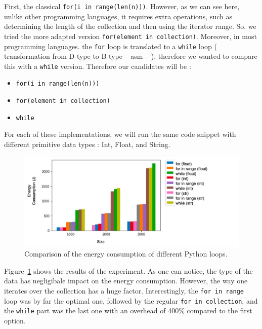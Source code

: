 First, the classical \texttt{for(i in range(len(n)))}.
However, as we can see here, unlike other programming languages, it requires extra operations, such as determining the length of the collection and then using the iterator range.
So, we tried the more adapted version \texttt{for(element in collection)}.
Moreover, in most programming languages. the \texttt{for} loop is translated to a \texttt{while} loop ( transformation from D type to B type -- asm -- ), therefore we wanted to compare this with a \texttt{while} version.
Therefore our candidates will be :

\begin{itemize}[]
    \item \texttt{for(i in range(len(n)))}
    \item \texttt{for(element in collection)}
    \item \texttt{while}
\end{itemize}

For each of these implementations, we will run the same code snippet with different primitive data types : Int, Float, and String.
\begin{figure}[!htb]
    \centering
    \includegraphics[width=\linewidth]{imgs/python_iterations}
    \caption{Comparison of the energy consumption of different Python loops.}
    \label{fig:pythonloops}
\end{figure}

Figure~\ref{fig:pythonloops} shows the results of the experiment. As one can notice, the type of the data has negligibale impact on the energy consumption.
However, the way one iterates over the collection has a huge factor.
Interestingly, the \texttt{for in range} loop was by far the optimal one, followed by the regular \texttt{for in collection}, and the \texttt{while} part was the last one with an overhead of 400\% compared to the first option.

